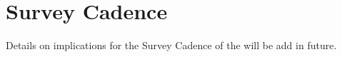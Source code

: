\section{Survey Cadence}

Details on implications for the Survey Cadence of the \esp will be add in future. 

